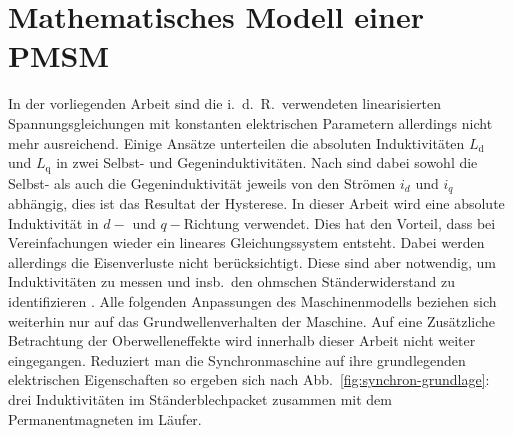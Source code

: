 \documentclass[conference,twocolumn]{IEEEtran}
\newcommand{\x}[1]{\mathrm{#1}}
\begin{document}
\section{Mathematisches Modell einer PMSM}\label{sec:math-pmsm}
In der vorliegenden Arbeit sind die i.\ d.\ R.\ verwendeten linearisierten Spannungsgleichungen mit konstanten elektrischen Parametern allerdings nicht mehr ausreichend.
Einige Ansätze unterteilen die absoluten Induktivitäten $L_\x{d}$ und $L_\x{q}$ in zwei Selbst- und Gegeninduktivitäten.
Nach \textcite{stumberger_evaluation_2003} sind dabei sowohl die Selbst- als auch die Gegeninduktivität jeweils von den Strömen $i_d$ und $i_q$ abhängig, dies ist das Resultat der Hysterese.
In dieser Arbeit wird eine absolute Induktivität in $d-$ und $q-$Richtung verwendet.
Dies hat den Vorteil, dass bei Vereinfachungen wieder ein lineares Gleichungssystem entsteht.
Dabei werden allerdings die Eisenverluste nicht berücksichtigt.
Diese sind aber notwendig, um Induktivitäten zu messen und insb.\ den ohmschen Ständerwiderstand zu identifizieren \autocite{Kellner2012}.
Alle folgenden Anpassungen des Maschinenmodells beziehen sich weiterhin nur auf das Grundwellenverhalten der Maschine.
Auf eine Zusätzliche Betrachtung der Oberwelleneffekte wird innerhalb dieser Arbeit nicht weiter eingegangen.
Reduziert man die Synchronmaschine auf ihre grundlegenden elektrischen Eigenschaften so ergeben sich nach Abb.~\ref{fig:synchron-grundlage}: drei Induktivitäten im Ständerblechpacket zusammen mit dem Permanentmagneten im Läufer.
\end{document}
